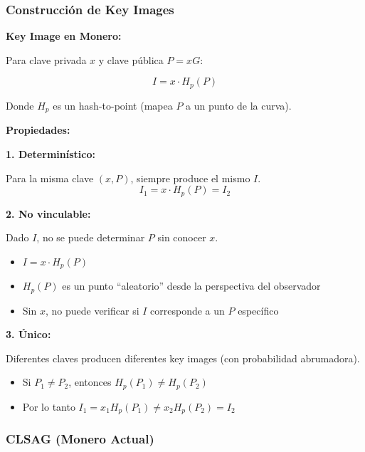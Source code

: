 \documentclass[11pt,a4paper,twoside]{book}
\begin{document}
\subsubsection{Construcci\'on de Key Images}

\begin{mathnote}
\textbf{Key Image en Monero:}

Para clave privada $x$ y clave p\'ublica $P = xG$:

\[ I = x \cdot H_p(P) \]

Donde $H_p$ es un hash-to-point (mapea $P$ a un punto de la curva).

\textbf{Propiedades:}

\textbf{1. Determin\'istico:}

Para la misma clave $(x, P)$, siempre produce el mismo $I$.
\[ I_1 = x \cdot H_p(P) = I_2 \]

\textbf{2. No vinculable:}

Dado $I$, no se puede determinar $P$ sin conocer $x$.
\begin{itemize}
    \item $I = x \cdot H_p(P)$
    \item $H_p(P)$ es un punto ``aleatorio'' desde la perspectiva del observador
    \item Sin $x$, no puede verificar si $I$ corresponde a un $P$ espec\'ifico
\end{itemize}

\textbf{3. \'Unico:}

Diferentes claves producen diferentes key images (con probabilidad abrumadora).
\begin{itemize}
    \item Si $P_1 \neq P_2$, entonces $H_p(P_1) \neq H_p(P_2)$
    \item Por lo tanto $I_1 = x_1 H_p(P_1) \neq x_2 H_p(P_2) = I_2$
\end{itemize}
\end{mathnote}

\subsubsection{CLSAG (Monero Actual)}
\end{document}
